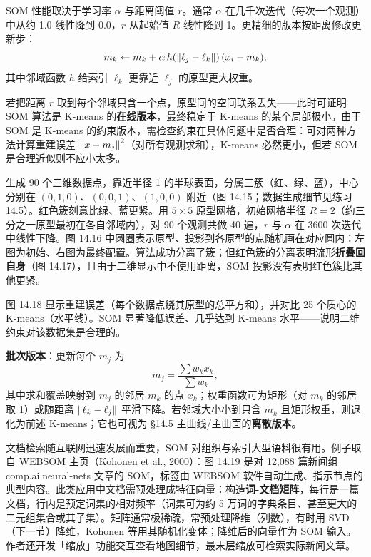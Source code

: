 SOM 性能取决于学习率 $\alpha$ 与距离阈值 $r$。通常 $\alpha$ 在几千次迭代（每次一个观测）中从约 1.0 线性降到 0.0，$r$ 从起始值 $R$ 线性降到 1。更精细的版本按距离修改更新步：
\begin{equation}
m_k \leftarrow m_k + \alpha\, h(\left\lVert\ell_j-\ell_k\right\rVert)\,(x_i - m_k), \label{eq:14_47}
\end{equation}
其中邻域函数 $h$ 给索引 $\ell_k$ 更靠近 $\ell_j$ 的原型更大权重。

\begin{remark}
若把距离 $r$ 取到每个邻域只含一个点，原型间的空间联系丢失——此时可证明 SOM 算法是 K-means 的\textbf{在线版本}，最终稳定于 K-means 的某个局部极小。由于 SOM 是 K-means 的约束版本，需检查约束在具体问题中是否合理：可对两种方法计算重建误差 $\left\lVert x-m_j\right\rVert^2$（对所有观测求和），K-means 必然更小，但若 SOM 是合理近似则不应小太多。
\end{remark}

\begin{example}[半球的模拟数据]
生成 90 个三维数据点，靠近半径 1 的半球表面，分属三簇（红、绿、蓝），中心分别在 $(0,1,0)$、$(0,0,1)$、$(1,0,0)$ 附近（图 14.15；数据生成细节见练习 14.5）。红色簇刻意比绿、蓝更紧。用 $5\times 5$ 原型网格，初始网格半径 $R=2$（约三分之一原型最初在各自邻域内），对 90 个观测共做 40 遍，$r$ 与 $\alpha$ 在 3600 次迭代中线性下降。图 14.16 中圆圈表示原型、投影到各原型的点随机画在对应圆内：左图为初始、右图为最终配置。算法成功分离了簇；但红色簇的分离表明流形\textbf{折叠回自身}（图 14.17），且由于二维显示中不使用距离，SOM 投影没有表明红色簇比其他更紧。

图 14.18 显示重建误差（每个数据点绕其原型的总平方和），并对比 25 个质心的 K-means（水平线）。SOM 显著降低误差、几乎达到 K-means 水平——说明二维约束对该数据集是合理的。

\textbf{批次版本}：更新每个 $m_j$ 为
\begin{equation}
m_j = \frac{\sum w_k x_k}{\sum w_k}, \label{eq:14_48}
\end{equation}
其中求和覆盖映射到 $m_j$ 的邻居 $m_k$ 的点 $x_k$；权重函数可为矩形（对 $m_k$ 的邻居取 1）或随距离 $\left\lVert\ell_k-\ell_j\right\rVert$ 平滑下降。若邻域大小小到只含 $m_k$ 且矩形权重，则退化为前述 K-means；它也可视为 §14.5 主曲线/主曲面的\textbf{离散版本}。
\end{example}

\begin{example}
文档检索随互联网迅速发展而重要，SOM 对组织与索引大型语料很有用。例子取自 WEBSOM 主页（Kohonen et al., 2000）：图 14.19 是对 12{,}088 篇新闻组 comp.ai.neural-nets 文章的 SOM，标签由 WEBSOM 软件自动生成、指示节点的典型内容。此类应用中文档需预处理成特征向量：构造\textbf{词-文档矩阵}，每行是一篇文档，行内是预定词集的相对频率（词集可为约 5 万词的字典条目、甚至更大的二元组集合或其子集）。矩阵通常极稀疏，常预处理降维（列数），有时用 SVD（下一节）降维，Kohonen 等用其随机化变体；降维后的向量作为 SOM 输入。作者还开发「缩放」功能交互查看地图细节，最末层缩放可检索实际新闻文章。
\end{example}

